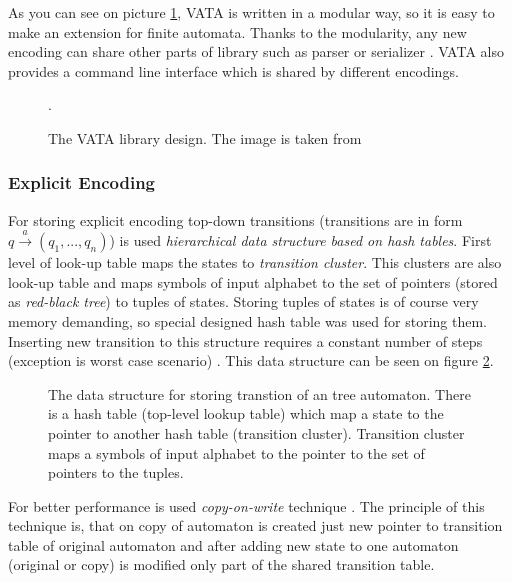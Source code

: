 As you
can see on picture \ref{picVataDesign}, VATA is written in a modular way, so it is easy to make an extension for finite automata. Thanks to the modularity, 
any new encoding can share other parts of library such as parser or serializer \cite{libvata}. VATA also provides a command line interface which is shared by
different encodings.

\begin{figure}[h]
\begin{center}

		\label{picVataDesign}
		\caption{The VATA library design. The image is taken from \cite{libvata}}.
\end{center}
\end{figure}

\subsubsection{Explicit Encoding}
\label{sectionExplicitEnc}
For storing explicit encoding top-down transitions (transitions are in form $q \xrightarrow{a} (q_1,...,q_n)$) 
is used \emph{hierarchical data structure based on hash tables}. First level of look-up
table maps the states to \emph{transition cluster}. This clusters are also look-up table and maps symbols of input alphabet
to the set of pointers (stored as \emph{red-black tree}) to tuples of states. Storing tuples of states is of course very memory demanding, so special
designed hash table was used for storing them. Inserting new transition to this structure requires a constant number of steps (exception is worst case scenario)
\cite{libvata}. This data structure can be seen on figure \ref{figExplicitTreeDataStr}.

\begin{figure}[h]
\begin{center}

		\label{figExplicitTreeDataStr}
    \caption{The data structure for storing transtion of an tree automaton. There is a hash table (top-level lookup table) 
      which map a state to the pointer to another hash table (transition cluster). Transition cluster
      maps a symbols of input alphabet to the pointer to the set of pointers to the tuples.}
\end{center}
\end{figure}


For better performance is used \emph{copy-on-write} technique \cite{libvata}. The principle of this technique is, 
that on copy of automaton is created just new pointer to transition table of original automaton and after adding new state to one automaton (original or
copy) is modified only part of the shared transition table. 

